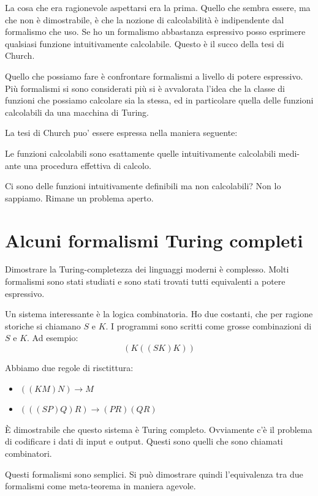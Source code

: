 La cosa che era ragionevole aspettarsi era la prima. Quello che sembra essere, ma che non è
dimostrabile, è che la nozione di calcolabilità è indipendente dal formalismo che uso. Se ho un
formalismo abbastanza espressivo posso esprimere qualsiasi funzione intuitivamente calcolabile.
Questo è il succo della tesi di Church.

Quello che possiamo fare è confrontare formalismi a livello di potere espressivo. Più formalismi
si sono considerati più si è avvalorata l'idea che la classe di funzioni che possiamo calcolare sia
la stessa, ed in particolare quella delle funzioni calcolabili da una macchina di Turing.

La tesi di Church puo' essere espressa nella maniera seguente:
\begin{thm}
    Le funzioni calcolabili sono esattamente quelle intuitivamente calcolabili medi-
    ante una procedura effettiva di calcolo.
\end{thm}

Ci sono delle funzioni intuitivamente definibili ma non calcolabili? Non lo sappiamo. Rimane un
problema aperto.

\section{Alcuni formalismi Turing completi}

Dimostrare la Turing-completezza dei linguaggi moderni è complesso. Molti formalismi sono stati
studiati e sono stati trovati tutti equivalenti a potere espressivo.

Un sistema interessante è la logica combinatoria. Ho due costanti, che per ragione storiche si
chiamano $S$ e $K$. I programmi sono scritti come grosse combinazioni di $S$ e $K$. Ad esempio:
\begin{equation*}
    (K ((S K) K))
\end{equation*}

Abbiamo due regole di risctittura:
\begin{itemize}
    \item $((K M) N) \to M$ 
    \item $(((S P) Q) R) \to (P R) (Q R)$
\end{itemize}

È dimostrabile che questo sistema è Turing completo. Ovviamente c'è il problema di codificare i
dati di input e output. Questi sono quelli che sono chiamati combinatori.

Questi formalismi sono semplici. Si può dimostrare quindi l'equivalenza tra due formalismi come
meta-teorema in maniera agevole.

